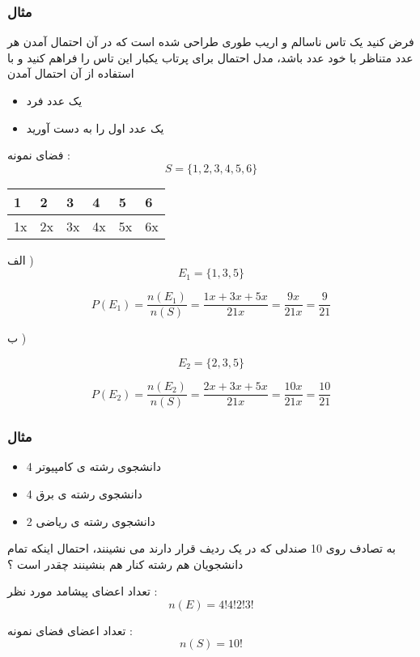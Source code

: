 \documentclass[12pt]{book}
\begin{document}
\subsubsection{مثال}
فرض کنید یک تاس ناسالم و اریب طوری طراحی شده است که در آن احتمال آمدن هر عدد متناظر با خود عدد باشد، مدل احتمال برای پرتاب یکبار این تاس را فراهم کنید و با استفاده از آن احتمال آمدن 
\begin{itemize}
	\item یک عدد فرد
	\item یک عدد اول را به دست آورید
\end{itemize}

فضای نمونه :
$$
S = \{ 1, 2, 3, 4, 5, 6 \}
$$


\begin{center}
\begin{latin}
\begin{tabular}{ l  l  l  l  l  l }
  1 & 2 & 3 & 4  & 5 & 6 \\
  \hline
  1x & 2x & 3x & 4x  & 5x & 6x \\
\end{tabular}
\end{latin}
\end{center}


الف ) 
$$
E_{1} = \{ 1, 3, 5 \} 
$$

$$
P(E_{1}) = \frac{n(E_{1})}{n(S)} = \frac{1x + 3x + 5x}{21x} = \frac{9x}{21x} = \frac{9}{21}
$$

ب )


$$
E_{2} = \{ 2, 3, 5 \} 
$$

$$
P(E_{2}) = \frac{n(E_{2})}{n(S)} = \frac{2x + 3x + 5x}{21x} = \frac{10x}{21x} = \frac{10}{21}
$$


\subsubsection{مثال}

\begin{itemize}
	\item 4 دانشجوی رشته ی کامپیوتر
	\item 4 دانشجوی رشته ی برق
	\item 2 دانشجوی رشته ی ریاضی
\end{itemize}
به تصادف روی 10 صندلی که در یک ردیف قرار دارند می نشینند، احتمال اینکه تمام دانشجویان هم رشته کنار هم بنشینند چقدر است ؟

تعداد اعضای پیشامد مورد نظر :
$$
n(E) = 4!4!2!3!
$$

تعداد اعضای فضای نمونه :
$$
n(S) = 10!
$$
\end{document}
